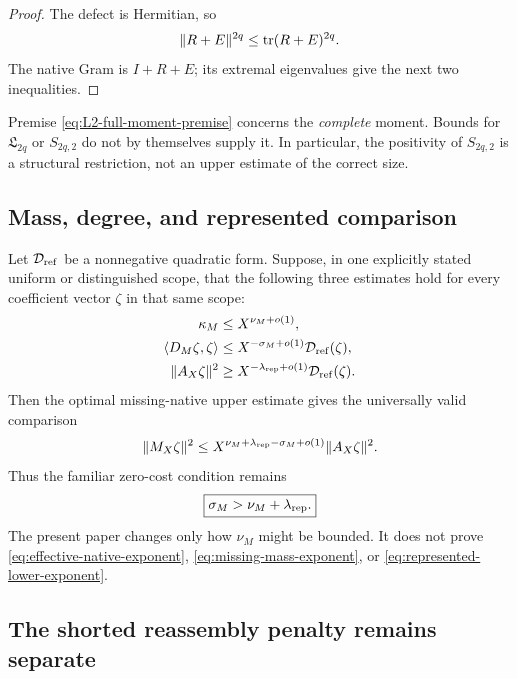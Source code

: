 \begin{proof}
The defect is Hermitian, so
\[
 \|R+E\|^{2q}\le\operatorname{tr}(R+E)^{2q}.
\]
The native Gram is \(I+R+E\); its extremal eigenvalues give the next two
inequalities.
\end{proof}

Premise \eqref{eq:L2-full-moment-premise} concerns the \emph{complete}
moment.  Bounds for \(\mathfrak L_{2q}\) or \(S_{2q,2}\) do not by
themselves supply it.  In particular, the positivity of \(S_{2q,2}\) is a
structural restriction, not an upper estimate of the correct size.

\subsection{Mass, degree, and represented comparison}

Let \(\mathcal D_{\rm ref}\) be a nonnegative quadratic form.  Suppose, in
one explicitly stated uniform or distinguished scope, that the following
three estimates hold for every coefficient vector \(\zeta\) in that same
scope:
\begin{align}
 \kappa_M&\le X^{\nu_M+o(1)},
 \label{eq:effective-native-exponent}\\
 \langle D_M\zeta,\zeta\rangle
 &\le X^{-\sigma_M+o(1)}\mathcal D_{\rm ref}(\zeta),
 \label{eq:missing-mass-exponent}\\
 \|A_X\zeta\|^2
 &\ge X^{-\lambda_{\rm rep}+o(1)}
       \mathcal D_{\rm ref}(\zeta).
 \label{eq:represented-lower-exponent}
\end{align}
Then the optimal missing-native upper estimate gives the universally
valid comparison
\begin{equation}
 \|M_X\zeta\|^2
 \le
 X^{\nu_M+\lambda_{\rm rep}-\sigma_M+o(1)}
 \|A_X\zeta\|^2.
 \label{eq:mass-degree-ratio}
\end{equation}
Thus the familiar zero-cost condition remains
\begin{equation}
 \boxed{\sigma_M>\nu_M+\lambda_{\rm rep}.}
 \label{eq:zero-cost-mass-degree-gate}
\end{equation}
The present paper changes only how \(\nu_M\) might be bounded.  It does not
prove \eqref{eq:effective-native-exponent},
\eqref{eq:missing-mass-exponent}, or
\eqref{eq:represented-lower-exponent}.

\subsection{The shorted reassembly penalty remains separate}

